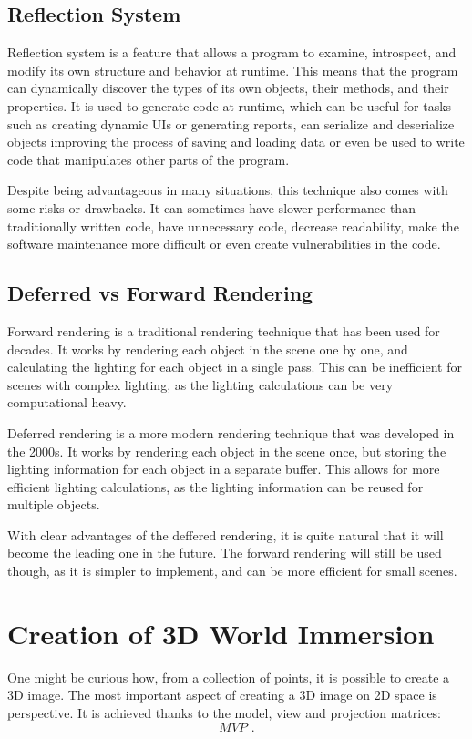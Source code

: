 \subsection{Reflection System}
\label{sec:refl}
\hspace{\parindent}
Reflection system is a feature that allows a program to examine, introspect, and modify its own structure and behavior at runtime. This means that the program can dynamically discover the types of its own objects, their methods, and their properties. It is used to generate code at runtime, which can be useful for tasks such as creating dynamic UIs or generating reports, can serialize and deserialize objects improving the process of saving and loading data or even be used to write code that manipulates other parts of the program.

Despite being advantageous in many situations, this technique also comes with some risks or drawbacks. It can sometimes have slower performance than traditionally written code, have unnecessary code, decrease readability, make the software maintenance more difficult or even create vulnerabilities in the code.

\subsection{Deferred vs Forward Rendering}
\label{sec:defer_vs_forward}
\hspace{\parindent}
Forward rendering is a traditional rendering technique that has been used for decades. It works by rendering each object in the scene one by one, and calculating the lighting for each object in a single pass. This can be inefficient for scenes with complex lighting, as the lighting calculations can be very computational heavy.

Deferred rendering is a more modern rendering technique that was developed in the 2000s. It works by rendering each object in the scene once, but storing the lighting information for each object in a separate buffer. This allows for more efficient lighting calculations, as the lighting information can be reused for multiple objects.

With clear advantages of the deffered rendering, it is quite natural that it will become the leading one in the future. The forward rendering will still be used though, as it is simpler to implement, and can be more efficient for small scenes.

\newpage
\section{Creation of 3D World Immersion}
\hspace{\parindent}
One might be curious how, from a collection of points, it is possible to create a 3D image. The most important aspect of creating a 3D image on 2D space is perspective. It is achieved thanks to the model, view and projection matrices:
\begin{equation}
MVP
\text{ .}
\label{mvpequation}
\end{equation}


